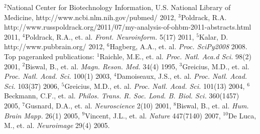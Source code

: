 \documentclass[final,hyperref={pdfpagelabels=false}]{beamer}
\begin{document}
\begin{frame}
{$^2$National Center for Biotechnology Information, U.S. National Library of Medicine, http://www.ncbi.nlm.nih.gov/pubmed/ 2012,
$^3$Poldrack, R.A. http://www.russpoldrack.org/2011/07/my-analysis-of-ohbm-2011-abstracts.html 2011,
$^4$Poldrack, R.A., et. al. \textit{Front. Neuroinform.} 5(17) 2011,
$^5$Kalar, D. http://www.pubbrain.org/ 2012,
$^6$Hagberg, A.A., et. al. \textit{Proc. SciPy2008} 2008.\\
Top pageranked publications:
$^1$Raichle, M.E., et. al. \textit{Proc. Natl. Aca.d Sci.} 98(2) 2001,
$^2$Biswal, B., et. al. \textit{Magn. Reson. Med.} 34(4) 1995,
$^3$Greicius, M.D., et. al. \textit{Proc. Natl. Acad. Sci.} 100(1) 2003,
$^4$Damoiseaux, J.S., et. al. \textit{Proc. Natl. Acad. Sci.} 103(37) 2006,
$^5$Greicius, M.D., et. al. \textit{Proc. Natl. Acad. Sci.} 101(13) 2004,
$^6$Beckmann, C.F., et. al. \textit{Philos. Trans. R. Soc. Lond. B. Biol. Sci.} 360(1457) 2005,
$^7$Gusnard, D.A., et. al. \textit{Neuroscience} 2(10) 2001,
$^8$Biswal, B., et. al. \textit{Hum. Brain Mapp.} 26(1) 2005,
$^9$Vincent, J.L., et. al. \textit{Nature} 447(7140) 2007,
$^{10}$De Luca, M., et. al. \textit{Neuroimage} 29(4) 2005.
}

\end{frame}
\end{document}
